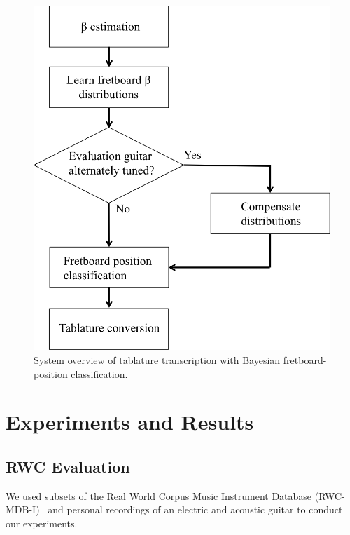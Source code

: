\documentclass[12pt]{cmuthesis}
\begin{document}
\begin{figure}[!htbp] 
\centering
\includegraphics[scale=0.6]{overviewMLE}
\caption{System overview of tablature transcription with Bayesian fretboard-position classification.}
\label{fig:overviewMLE}
\end{figure}

\noindent
\chapter{Experiments and Results}
\label{chap:experiments}
\section{RWC Evaluation}

We used subsets of the Real World Corpus Music Instrument Database (RWC-MDB-I)~\cite{goto2003} and personal recordings of an electric and acoustic guitar to conduct our experiments. 
\end{document}
